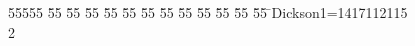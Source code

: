 %
%
\begin{tabbing}
55555 \= 55 \= 55 \= 55 \= 55 \= 55 \= 55 \= 55 \= 55 \= 55 \= 55 \= 55 \= 55 \= \>Dickson1=1417112115\\[0pt]
2\>\end{tabbing}
